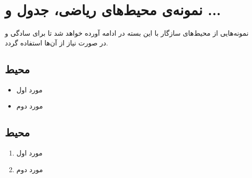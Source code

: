 \section{نمونه‌ی محیط‌های ریاضی، جدول و ...}
نمونه‌هایی از محیط‌های سازگار با این بسته در ادامه آورده خواهد شد تا برای سادگی و در صورت نیاز از آن‌ها استفاده گردد. 
\subsection{محیط }
\begin{itemize}
\item مورد اول
\item مورد دوم
\end{itemize}
\subsection{محیط }
\begin{enumerate}
\item مورد اول
\item مورد دوم
\end{enumerate}
